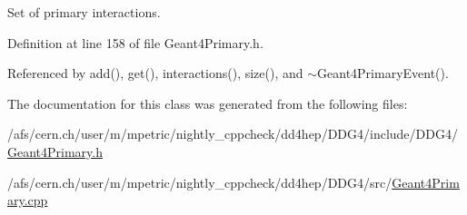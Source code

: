 Set of primary interactions. 

Definition at line 158 of file Geant4Primary.h.

Referenced by add(), get(), interactions(), size(), and $\sim$Geant4PrimaryEvent().

The documentation for this class was generated from the following files:\begin{DoxyCompactItemize}
\item 
/afs/cern.ch/user/m/mpetric/nightly\_\-cppcheck/dd4hep/DDG4/include/DDG4/\hyperlink{_geant4_primary_8h}{Geant4Primary.h}\item 
/afs/cern.ch/user/m/mpetric/nightly\_\-cppcheck/dd4hep/DDG4/src/\hyperlink{_geant4_primary_8cpp}{Geant4Primary.cpp}\end{DoxyCompactItemize}
